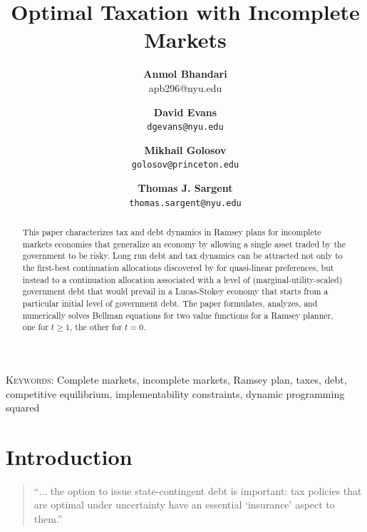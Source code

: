 \documentclass[12pt]{article}
\title {Optimal Taxation with Incomplete Markets}
\author{\textbf{Anmol Bhandari}\\apb296@nyu.edu \and \textbf{David Evans} \\ \texttt{dgevans@nyu.edu} \and \textbf{Mikhail Golosov}\\\texttt{golosov@princeton.edu} \and \textbf{Thomas J. Sargent} \\ \texttt{thomas.sargent@nyu.edu}
}
\begin{document}
\maketitle



\begin{abstract}  This paper characterizes tax and debt dynamics in Ramsey plans for incomplete markets economies that generalize
an \citet{Aiyagari2002} economy by allowing a single asset traded by the government  to be risky.  
Long run debt and tax dynamics can be attracted  not only to the first-best continuation allocations discovered by \citeauthor{Aiyagari2002} for quasi-linear preferences, but instead 
 to a continuation allocation  associated with a level of (marginal-utility-scaled) government debt that would prevail in a Lucas-Stokey
economy that starts from a particular initial level of government debt.  The paper formulates, analyzes, and numerically solves  Bellman equations
for two value functions for a Ramsey planner, one for $t \geq 1$, the other for $t=0$.  



\end{abstract}


\noindent\textsc{Keywords:} Complete markets, incomplete markets, Ramsey plan, taxes, debt, competitive equilibrium, implementability constraints,
dynamic programming squared

\newpage

\section{Introduction}


\begin{quote}
``$\ldots$ the option to issue state-contingent debt is important: tax policies that
are optimal under uncertainty have an essential `insurance' aspect to them.'' \quad \citet[p.~88]{LucasJr.1983}
\end{quote}
\end{document}
